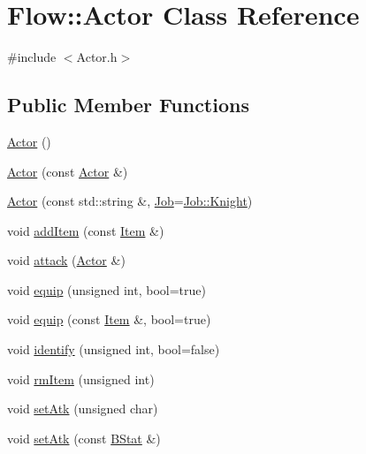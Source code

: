 \hypertarget{class_flow_1_1_actor}{}\section{Flow\+:\+:Actor Class Reference}
\label{class_flow_1_1_actor}


{\ttfamily \#include $<$Actor.\+h$>$}

\subsection*{Public Member Functions}
\begin{DoxyCompactItemize}
\item 
\hyperlink{class_flow_1_1_actor_a242b634b62029fb8fc3226e6dae85606}{Actor} ()
\item 
\hyperlink{class_flow_1_1_actor_a87c772011a71a40cba07f3f4122eeaec}{Actor} (const \hyperlink{class_flow_1_1_actor}{Actor} \&)
\item 
\hyperlink{class_flow_1_1_actor_a5e8bbbcb474e2c2122dc012849c71d77}{Actor} (const std\+::string \&, \hyperlink{namespace_flow_a05bb774db920847e46f3779aaef1b07b}{Job}=\hyperlink{namespace_flow_a05bb774db920847e46f3779aaef1b07ba8c23b2b86573edf2a5ea482c2ccc1497}{Job\+::\+Knight})
\item 
void \hyperlink{class_flow_1_1_actor_afefe67bd3da9a846d7f6cadb865e2109}{add\+Item} (const \hyperlink{class_flow_1_1_item}{Item} \&)
\item 
void \hyperlink{class_flow_1_1_actor_a37e4e24d0896e55da37ff88483b2e302}{attack} (\hyperlink{class_flow_1_1_actor}{Actor} \&)
\item 
void \hyperlink{class_flow_1_1_actor_a4433bb3ae20b14962659588c259da624}{equip} (unsigned int, bool=true)
\item 
void \hyperlink{class_flow_1_1_actor_acf1918a44fafa59fd8bde330d4b9f01c}{equip} (const \hyperlink{class_flow_1_1_item}{Item} \&, bool=true)
\item 
void \hyperlink{class_flow_1_1_actor_ae4cb3aadfe983b6bee09b27649dbb704}{identify} (unsigned int, bool=false)
\item 
void \hyperlink{class_flow_1_1_actor_ad0c8afd90595778d5d7db6d1c011cf66}{rm\+Item} (unsigned int)
\item 
void \hyperlink{class_flow_1_1_actor_acbf21154d7e206e1c9c40d43d6ae88b3}{set\+Atk} (unsigned char)
\item 
void \hyperlink{class_flow_1_1_actor_a2f9aa41cb7a5e4a4319d26df739e6cbc}{set\+Atk} (const \hyperlink{class_flow_1_1_b_stat}{B\+Stat} \&)

\end{DoxyCompactItemize}
